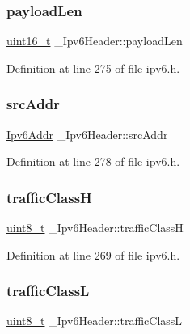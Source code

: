 \subsubsection{\texorpdfstring{payload\+Len}{payloadLen}}
{\footnotesize\ttfamily \hyperlink{stdint_8h_a273cf69d639a59973b6019625df33e30}{uint16\+\_\+t} \+\_\+\+Ipv6\+Header\+::payload\+Len}



Definition at line 275 of file ipv6.\+h.

\mbox{\label{struct__Ipv6Header_aefa2890bda23486ff09f625bd6fd1092}} 
\subsubsection{\texorpdfstring{src\+Addr}{srcAddr}}
{\footnotesize\ttfamily \hyperlink{ipv6_8h_aed0cbc40c61ed5b4fb681ebc55237e89}{Ipv6\+Addr} \+\_\+\+Ipv6\+Header\+::src\+Addr}



Definition at line 278 of file ipv6.\+h.

\mbox{\label{struct__Ipv6Header_a6f4116e9ac636281c9f9c1126ce32a2b}} 
\subsubsection{\texorpdfstring{traffic\+ClassH}{trafficClassH}}
{\footnotesize\ttfamily \hyperlink{stdint_8h_aba7bc1797add20fe3efdf37ced1182c5}{uint8\+\_\+t} \+\_\+\+Ipv6\+Header\+::traffic\+ClassH}



Definition at line 269 of file ipv6.\+h.

\mbox{\label{struct__Ipv6Header_ac61d4c4fd52f4d1c176d6b5410be6f70}} 
\subsubsection{\texorpdfstring{traffic\+ClassL}{trafficClassL}}
{\footnotesize\ttfamily \hyperlink{stdint_8h_aba7bc1797add20fe3efdf37ced1182c5}{uint8\+\_\+t} \+\_\+\+Ipv6\+Header\+::traffic\+ClassL}



